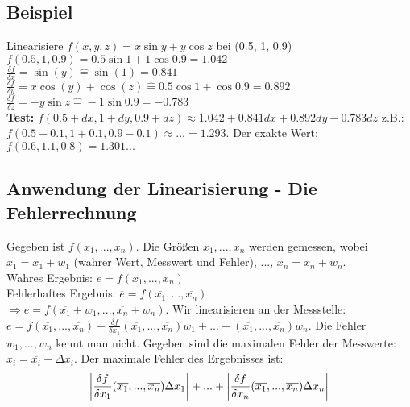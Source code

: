 \renewcommand{\ldate}{2015-10-02}	%

\subsection{Beispiel} Linearisiere
$ f(x,y,z) = x  \sin y + y  \cos z$ bei (0.5, 1, 0.9)\\
$ f(0.5, 1, 0.9) = 0.5 \sin 1 + 1  \cos 0.9 = 1.042 $ \\
$ \frac{\delta f}{\delta x} = \sin(y) \widehat{=} \sin(1) = 0.841 $ \\
$ \frac{\delta f}{\delta y} = x \cos(y) + \cos(z) \widehat{=} 0.5 \cos 1 + \cos 0.9 = 0.892 $ \\
$ \frac{\delta f}{\delta z} = -y \sin z \widehat{=} -1 \sin 0.9 = -0.783$ \\
\textbf{Test:} $ f(0.5+dx,1+dy,0.9+dz) \approx 1.042+0.841 dx + 0.892 dy - 0.783 dz$ z.B.: $ f(0.5+0.1,1+0.1,0.9-0.1) \approx ... = 1.293$. Der exakte Wert: $ f(0.6, 1.1, 0.8) = 1.301...$

\subsection{Anwendung der Linearisierung - Die Fehlerrechnung}
Gegeben ist $ f(x_1, ..., x_n)$. Die Größen $ x_1, ..., x_n $ werden gemessen, wobei $x_1 = \overline{x_1} + w_1$ (wahrer Wert, Messwert und Fehler), ..., $x_n = \overline{x_n} + w_n$.\\
Wahres Ergebnis: $ e = f(x_1, ..., x_n) $\\
Fehlerhaftes Ergebnis: $ \overline{e} = f(\overline{x_1}, ..., \overline{x_n}) $\\ 
$ \Rightarrow e = f(\overline{x_1}+w_1, ..., \overline{x_n}+w_n) $. Wir linearisieren an der Messstelle: $ e = f(\overline{x_1}, ..., \overline{x_n}) + \frac{\delta f}{\delta x_1} (\overline{x_1},...,\overline{x_n}) w_1 + ... + (\overline{x_1},...,\overline{x_n}) w_n $. Die Fehler $w_1, ..., w_n$ kennt man nicht. Gegeben sind die maximalen Fehler der Messwerte: $x_i = \overline{x_i} \pm \Delta x_i$. Der maximale Fehler des Ergebnisses ist: 
\[
 \left\vert \frac{\delta f}{\delta x_1} (\overline{x_1},...,\overline{x_n}) \Delta x_1  \right\vert  + ... +  \left\vert \frac{\delta f}{\delta x_n} (\overline{x_1},...,\overline{x_n}) \Delta x_n \right\vert 
\]

